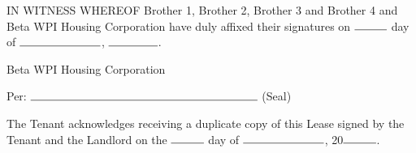 \documentclass[12pt]{article}
\begin{document}
\clearpage

IN WITNESS WHEREOF Brother 1, Brother 2, Brother 3 and Brother 4 and Beta WPI
Housing Corporation have duly affixed their signatures on $\rule{1cm}{0.15mm}$
day of $\rule{2.5cm}{0.15mm}$, $\rule{1.5cm}{0.15mm}$.
  	

\begin{flushright} Beta WPI Housing Corporation

\vspace{1cm}

Per: $\rule{7cm}{0.15mm}$ (Seal)
  	

\signature{Brother 1}

\signature{Brother 2}

\signature{Brother 3}

\signature{Brother 4}

\signature{Brother 5} \end{flushright}

\clearpage

The Tenant acknowledges receiving a duplicate copy of this Lease signed by the
Tenant and the Landlord on the $\rule{1cm}{0.15mm}$ day of
$\rule{2.5cm}{0.15mm}$, 20$\rule{1cm}{0.15mm}$.
  	
\begin{flushright}

\signature{Brother 1}

\signature{Brother 2}

\signature{Brother 3}

\signature{Brother 4}

\signature{Brother 5}

\end{flushright}

\clearpage
\guaranty{}
\clearpage
\guaranty{}
\clearpage
\guaranty{}
\clearpage
\guaranty{}
\clearpage
\guaranty{}
\clearpage
\end{document}
